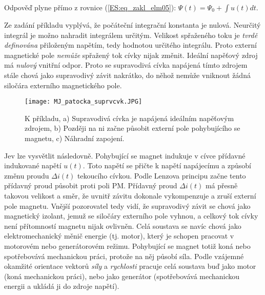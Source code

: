       Odpověď plyne přímo z rovnice (\ref{ES:eq_zakl_elm05}): \(\Psi(t) = \Psi_0 +\int u(t)dt\).
      
      Ze zadání příkladu vyplývá, že počáteční integrační konstanta je nulová. Neurčitý integrál je
      možno nahradit integrálem určitým. Velikost spřaženého toku je \emph{tvrdě definována} 
      přiloženým napětím, tedy hodnotou určitého integrálu. Proto externí magnetické pole 
      \emph{nemůže} spřažený tok cívky nijak změnit. Ideální napěťový zdroj má \emph{nulový} 
      vnitřní odpor. Proto se supravodivá cívka napájená tímto zdrojem stále chová jako supravodivý 
      závit nakrátko, do něhož nemůže vniknout žádná siločára externího magnetického pole.
      
      \begin{figure}[ht!]
        \centering
        \texttt{[image: MJ\_patocka\_suprvcvk.JPG]}
        \caption[Supravodivá cívka]{K příkladu, a) Supravodivá cívka je napájená ideálním napěťovým
                 zdrojem, b) Později na ni začne působit externí pole pohybujícího se magnetu, c)
                 Náhradní zapojení.}
        \label{es:fig_MJ_patocka_suprvcvk}
      \end{figure} 
      
      Jev lze vysvětlit následovně. Pohybující se magnet indukuje v cívce přídavné indukované 
      napětí \(u(t)\). Toto napětí se přičte k napětí napájecímu a způsobí změnu proudu \(\Delta 
      i(t)\) tekoucího cívkou. Podle Lenzova principu začne tento přídavný proud působit proti poli 
      PM. Přídavný proud \(\Delta i(t)\) má přesně takovou velikost a směr, že uvnitř závitu 
      dokonale vykompenzuje a zruší externí pole magnetu. Vnější pozorovatel tedy vidí, že 
      supravodivý závit se chová jako magnetický izolant, jemuž se siločáry externího pole vyhnou, 
      a celkový tok cívky není přítomností magnetu nijak ovlivněn. Celá soustava se navíc chová 
      jako elektromechanický měnič energie (tj. motor), který je schopen pracovat v motorovém nebo 
      generátorovém režimu. Pohybující se magnet totiž koná nebo spotřebovává mechanickou práci, 
      protože na něj působí síla. Podle vzájemné okamžité orientace vektorů \emph{síly} a 
      \emph{rychlosti} pracuje celá soustava buď jako motor (koná mechanickou práci), nebo jako 
      generátor (spotřebovává mechanickou energii a ukládá ji do zdroje napětí).


